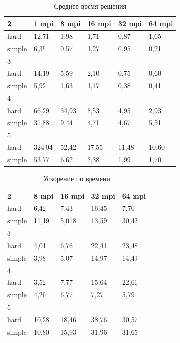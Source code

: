 \documentclass[runningheads]{llncs}
\begin{document}
\begin{table}[!ht]
	\caption{Среднее время решения}
	\label{tab:1}
	\centering	
	\begin{tabular}{|l|l|l|l|l|l|}
		\hline
		2 & 1 mpi & 8 mpi & 16 mpi & 32 mpi & 64 mpi  \\ \hline
		hard & 12,71 & 1,98 & 1,71 & 0,87 & 1,65  \\ \hline
		simple & 6,35 & 0,57 & 1,27 & 0,95 & 0,21  \\ \hline
		3 & ~ & ~ & ~ & ~ &  \\ \hline
		hard & 14,19 & 5,59 & 2,10 & 0,75 & 0,60  \\ \hline
		simple & 5,92 & 1,63 & 1,17 & 0,38 & 0,41  \\ \hline
		4 & ~ & ~ & ~ & ~ &   \\ \hline
		hard & 66,29 & 34,93 & 8,53 & 4,95 & 2,93  \\ \hline
		simple & 31,88 & 9,44 & 4,71 & 4,67 & 5,51  \\ \hline
		5 & ~ & ~ & ~ & ~ &  \\ \hline
		hard & 324,04 & 52,42 & 17,55 & 11,48 & 10,60 \\ \hline
		simple & 53,77 & 6,62 & 3,38 & 1,99 & 1,70  \\ \hline
	\end{tabular}
\end{table}


\begin{table}[!ht]
	\caption{Ускорение по времени}
	\label{tab:2}
	\centering	
	\begin{tabular}{|l|l|l|l|l|}
		\hline
		2 & 8 mpi & 16 mpi & 32 mpi & 64 mpi  \\ \hline
		hard & 6,42 & 7,43 & 16,45 & 7,70  \\ \hline
		simple & 11,19 & 5,018 & 13,59 & 30,42  \\ \hline
		3 & ~ & ~ & ~ &   \\ \hline
		hard & 4,01 & 6,76 & 22,41 & 23,48  \\ \hline
		simple & 3,98 & 5,07 & 14,97 & 14,49  \\ \hline
		4 & ~ & ~ & ~ &   \\ \hline
		hard & 3,52 & 7,77 & 15,64 & 22,61  \\ \hline
		simple & 4,20 & 6,77 & 7,27 & 5,79  \\ \hline
		5 & ~ & ~ & ~ &   \\ \hline
		hard & 10,28 & 18,46 & 38,76 & 30,57  \\ \hline
		simple & 10,80 & 15,93 & 31,96 & 31,65  \\ \hline
	\end{tabular}
\end{table}
\end{document}

